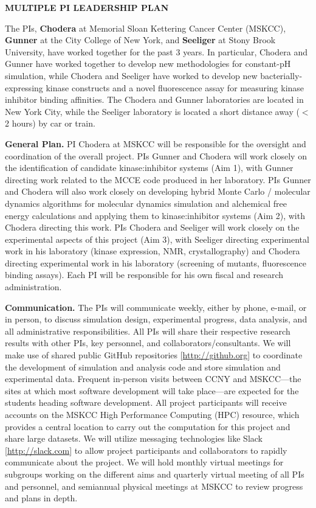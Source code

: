 \documentclass[11pt]{article}
\begin{document}

{\bf MULTIPLE PI LEADERSHIP PLAN}


The PIs, {\bf Chodera} at Memorial Sloan Kettering Cancer Center (MSKCC), {\bf Gunner} at the City College of New York, and {\bf Seeliger} at Stony Brook University, have worked together for the past 3 years.  
In particular, Chodera and Gunner have worked together to develop new methodologies for constant-pH simulation, while Chodera and Seeliger have worked to develop new bacterially-expressing kinase constructs and a novel fluorescence assay for measuring kinase inhibitor binding affinities.
The Chodera and Gunner laboratories are located in New York City, while the Seeliger laboratory is located a short distance away ($<$2 hours) by car or train.

{\bf General Plan.}  
PI Chodera at MSKCC will be responsible for the oversight and coordination of the overall project.
PIs Gunner and Chodera will work closely on the identification of candidate kinase:inhibitor systems (Aim 1), with Gunner directing work related to the MCCE code produced in her laboratory.
PIs Gunner and Chodera will also work closely on developing hybrid Monte Carlo / molecular dynamics algorithms for molecular dynamics simulation and alchemical free energy calculations and applying them to kinase:inhibitor systems (Aim 2), with Chodera directing this work.
PIs Chodera and Seeliger will work closely on the experimental aspects of this project (Aim 3), with Seeliger directing experimental work in his laboratory (kinase expression, NMR, crystallography) and Chodera directing experimental work in his laboratory (screening of mutants, fluorescence binding assays).
Each PI will be responsible for his own fiscal and research administration.

{\bf Communication.}
The PIs will communicate weekly, either by phone, e-mail, or in person, to discuss simulation design, experimental progress, data analysis, and all administrative responsibilities. 
All PIs will share their respective research results with other PIs, key personnel, and collaborators/consultants.  
We will make use of shared public GitHub repositories [\url{http://github.org}] to coordinate the development of simulation and analysis code and store simulation and experimental data.
Frequent in-person visits between CCNY and MSKCC---the sites at which most software development will take place---are expected for the students heading software development.
All project participants will receive accounts on the MSKCC High Performance Computing (HPC) resource, which provides a central location to carry out the computation for this project and share large datasets.
We will utilize messaging technologies like Slack [\url{http://slack.com}] to allow project participants and collaborators to rapidly communicate about the project.
We will hold monthly virtual meetings for subgroups working on the different aims and quarterly virtual meeting of all PIs and personnel, and semiannual physical meetings at MSKCC to review progress and plans in depth. 
\end{document}

